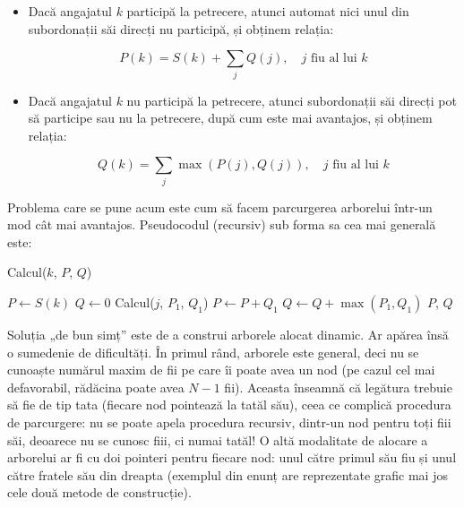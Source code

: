\begin{itemize}

\item Dacă angajatul $k$ participă la petrecere, atunci automat nici unul din
  subordonații săi direcți nu participă, și obținem relația:

  \begin{equation}
    P(k) = S(k) + \sum_j Q(j), \quad j \text{ fiu al lui } k
  \end{equation}

\item Dacă angajatul $k$ nu participă la petrecere, atunci subordonații săi
  direcți pot să participe sau nu la petrecere, după cum este mai avantajos,
  și obținem relația:

  \begin{equation}
    Q(k) = \sum_j \max(P(j), Q(j)), \quad j \text{ fiu al lui } k
  \end{equation}

\end{itemize}

Problema care se pune acum este cum să facem parcurgerea arborelui într-un mod
cât mai avantajos. Pseudocodul (recursiv) sub forma sa cea mai generală este:

\vspace{\algskip}
\begin{algorithm}
  \caption{Calcul($k$, $P$, $Q$)}
  \begin{algorithmic}[1]
    \STATE $P \leftarrow S(k)$
    \STATE $Q \leftarrow 0$
    \STATE Calcul($j$, $P_1$, $Q_1$)
    \STATE $P \leftarrow P + Q_1$
    \STATE $Q \leftarrow Q + \max(P_1, Q_1)$
    \ENDFOR
    \RETURN $P$, $Q$
  \end{algorithmic}
\end{algorithm}

Soluția „de bun simț” este de a construi arborele alocat dinamic. Ar apărea
însă o sumedenie de dificultăți. În primul rând, arborele este general, deci
nu se cunoaște numărul maxim de fii pe care îi poate avea un nod (pe cazul cel
mai defavorabil, rădăcina poate avea $N-1$ fii). Aceasta înseamnă că legătura
trebuie să fie de tip tata (fiecare nod pointează la tatăl său), ceea ce
complică procedura de parcurgere: nu se poate apela procedura recursiv,
dintr-un nod pentru toți fiii săi, deoarece nu se cunosc fiii, ci numai tatăl!
O altă modalitate de alocare a arborelui ar fi cu doi pointeri pentru fiecare
nod: unul către primul său fiu și unul către fratele său din dreapta (exemplul
din enunț are reprezentate grafic mai jos cele două metode de construcție).

